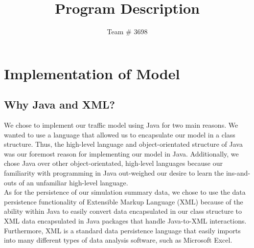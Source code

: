\documentclass[letterpaper,12pt]{article}
\author{Team \# 3698}
\title{Program Description}
\begin{document}
	\section{Implementation of Model}
		\subsection{Why Java and XML?}
			We chose to implement our traffic model using Java for two main reasons. We wanted to use a language that allowed us to encapsulate our model in a class structure. Thus, the high-level language and object-orientated structure of Java was our foremost reason for implementing our model in Java.  Additionally, we chose Java over other object-orientated, high-level languages because our familiarity with programming in Java out-weighed our desire to learn the ins-and-outs of an unfamiliar high-level language. \\
			As for the persistence of our simulation summary data, we chose to use the data persistence functionality of Extensible Markup Language (XML) because of the ability within Java to easily convert data encapsulated in our class structure to XML data encapsulated in Java packages that handle Java-to-XML interactions. Furthermore, XML is a standard data persistence language that easily imports into many different types of data analysis software, such as Microsoft Excel.  
\end{document}
